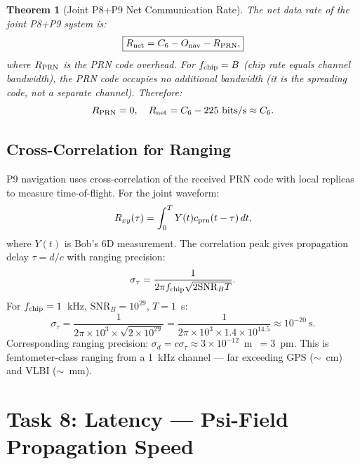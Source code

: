 \documentclass[aps,prd,twocolumn,superscriptaddress,nofootinbib]{revtex4-2}
\newcommand{\SNR}{\mathrm{SNR}}
\newtheorem{theorem}{Theorem}
\begin{document}
\begin{theorem}[Joint P8+P9 Net Communication Rate]
\label{thm:joint-rate}
The net data rate of the joint P8+P9 system is:
\begin{equation}
\boxed{
R_{\rm net} = C_6 - O_{\rm nav} - R_{\rm PRN},
}
\label{eq:Rnet}
\end{equation}
where $R_{\rm PRN}$ is the PRN code overhead. For $f_{\rm chip} = B$ (chip rate
equals channel bandwidth), the PRN code occupies no additional bandwidth
(it is the spreading code, not a separate channel). Therefore:
\begin{equation}
R_{\rm PRN} = 0, \quad R_{\rm net} = C_6 - 225~\text{bits/s} \approx C_6.
\end{equation}
\end{theorem}

\subsection{Cross-Correlation for Ranging}

P9 navigation uses cross-correlation of the received PRN code with local
replicas to measure time-of-flight. For the joint waveform:
\begin{equation}
R_{xy}(\tau) = \int_0^T Y(t) c_{\rm prn}(t-\tau)\, dt,
\label{eq:xcorr}
\end{equation}
where $Y(t)$ is Bob's 6D measurement. The correlation peak gives
propagation delay $\tau = d/c$ with ranging precision:
\begin{equation}
\sigma_\tau = \frac{1}{2\pi f_{\rm chip} \sqrt{2 \SNR_B T}}.
\label{eq:ranging-precision}
\end{equation}
For $f_{\rm chip} = 1$~kHz, $\SNR_B = 10^{29}$, $T = 1$~s:
\begin{equation}
\sigma_\tau = \frac{1}{2\pi \times 10^3 \times \sqrt{2\times10^{29}}}
= \frac{1}{2\pi \times 10^3 \times 1.4\times10^{14.5}}
\approx 10^{-20}~\text{s}.
\end{equation}
Corresponding ranging precision: $\sigma_d = c \sigma_\tau \approx 3\times10^{-12}$~m~$= 3$~pm.
This is femtometer-class ranging from a 1~kHz channel
--- far exceeding GPS ($\sim$~cm) and VLBI ($\sim$~mm).

\section{Task 8: Latency --- Psi-Field Propagation Speed}
\label{sec:latency}
\end{document}
